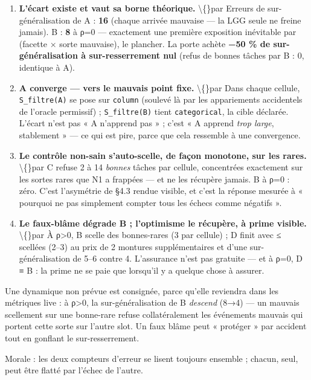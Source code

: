 \documentclass[11pt]{article}
\begin{document}
\begin{enumerate}
\item \textbf{L'écart existe et vaut sa borne théorique.} \textbackslash\{\}par Erreurs de sur-généralisation de A : \textbf{16} (chaque arrivée mauvaise — la LGG seule ne freine jamais). B : \textbf{8} à ρ=0 — exactement une première exposition inévitable par (facette × sorte mauvaise), le plancher. La porte achète \textbf{−50 \% de sur-généralisation à sur-resserrement nul} (refus de bonnes tâches par B : 0, identique à A).

\item \textbf{A converge — vers le mauvais point fixe.} \textbackslash\{\}par Dans chaque cellule, \texttt{S\_filtre(A)} se pose sur \texttt{column} (soulevé là par les appariements accidentels de l'oracle permissif) ; \texttt{S\_filtre(B)} tient \texttt{categorical}, la cible déclarée. L'écart n'est pas « A n'apprend pas » ; c'est « A apprend \emph{trop large}, stablement » — ce qui est pire, parce que cela ressemble à une convergence.

\item \textbf{Le contrôle non-sain s'auto-scelle, de façon monotone, sur les rares.} \textbackslash\{\}par C refuse 2 à 14 \emph{bonnes} tâches par cellule, concentrées exactement sur les sortes rares que N1 a frappées — et ne les récupère jamais. B à ρ=0 : zéro. C'est l'asymétrie de §4.3 rendue visible, et c'est la réponse mesurée à « pourquoi ne pas simplement compter tous les échecs comme négatifs ».

\item \textbf{Le faux-blâme dégrade B ; l'optimisme le récupère, à prime visible.} \textbackslash\{\}par À ρ>0, B scelle des bonnes-rares (3 par cellule) ; D finit avec ≤ scellées (2–3) au prix de 2 montures supplémentaires et d'une sur-généralisation de 5–6 contre 4. L'assurance n'est pas gratuite — et à ρ=0, D ≡ B : la prime ne se paie que lorsqu'il y a quelque chose à assurer.
\end{enumerate}

Une dynamique non prévue est consignée, parce qu'elle reviendra dans les métriques live : à ρ>0, la sur-généralisation de B \emph{descend} (8→4) — un mauvais scellement sur une bonne-rare refuse collatéralement les événements mauvais qui portent cette sorte sur l'autre slot. Un faux blâme peut « protéger » par accident tout en gonflant le sur-resserrement.

Morale : les deux compteurs d'erreur se lisent toujours ensemble ; chacun, seul, peut être flatté par l'échec de l'autre.
\end{document}
